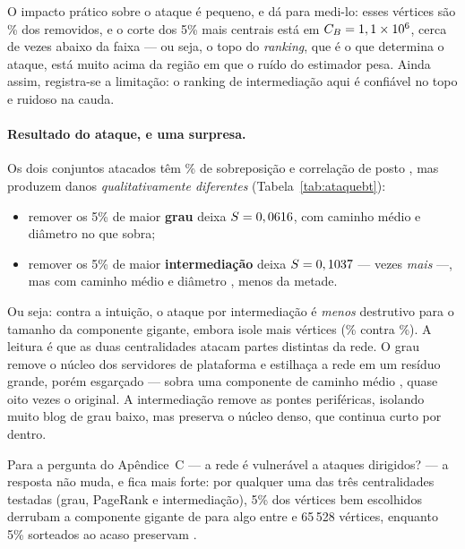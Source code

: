 \documentclass[sigconf]{webmedia}
\begin{document}
O impacto prático sobre o ataque é pequeno, e dá para medi-lo: esses
\btPorteiros{} vértices são \btPorteirosPct{}\% dos \robR{} removidos, e
o corte dos 5\% mais centrais está em $C_B = 1,1 \times 10^{6}{}$, cerca de
\btFatorCorte{} vezes abaixo da faixa --- ou seja, o topo do
\textit{ranking}, que é o que determina o ataque, está muito acima da
região em que o ruído do estimador pesa. Ainda assim, registra-se a
limitação: o ranking de intermediação aqui é confiável no topo e ruidoso
na cauda.

\paragraph{Resultado do ataque, e uma surpresa.} Os dois conjuntos
atacados têm \btSobreposicao{}\% de sobreposição e correlação de posto
\btSpearman{}, mas produzem danos \emph{qualitativamente diferentes}
(Tabela~\ref{tab:ataquebt}):

\begin{itemize}[nosep]
  \item remover os 5\% de maior \textbf{grau} deixa $S=0,0616{}$, com
        caminho médio \btGrauL{} e diâmetro \btGrauDiam{} no que sobra;
  \item remover os 5\% de maior \textbf{intermediação} deixa
        $S=0,1037{}$ --- \btRazaoS{} vezes \emph{mais} ---, mas com
        caminho médio \btL{} e diâmetro \btDiam{}, menos da metade.
\end{itemize}

\noindent
Ou seja: contra a intuição, o ataque por intermediação é \emph{menos}
destrutivo para o tamanho da componente gigante, embora isole mais
vértices (\btIso{}\% contra \btGrauIso{}\%). A leitura é que as duas
centralidades atacam partes distintas da rede. O grau remove o núcleo
dos servidores de plataforma e estilhaça a rede em um resíduo grande,
porém esgarçado --- sobra uma componente de caminho médio \btGrauL{},
quase oito vezes o original. A intermediação remove as pontes
periféricas, isolando muito blog de grau baixo, mas preserva o núcleo
denso, que continua curto por dentro.

Para a pergunta do Apêndice~C --- a rede é vulnerável a ataques
dirigidos? --- a resposta não muda, e fica mais forte: por qualquer uma
das três centralidades testadas (grau, PageRank e intermediação), 5\%
dos vértices bem escolhidos derrubam a componente gigante de
\robSintacto{} para algo entre \robScentAbs{} e 65\,528 vértices,
enquanto 5\% sorteados ao acaso preservam \robSrandAbs{}.
\end{document}
